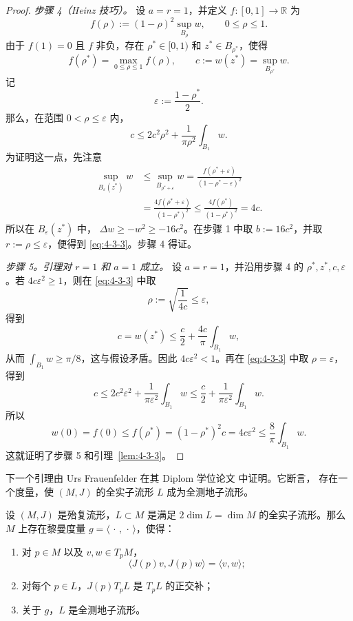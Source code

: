 \begin{proof}
\smallskip
\noindent\textit{步骤 4（Heinz 技巧）。}
设 $a=r=1$，并定义 $f:[0,1]\to\mathbb R$ 为
\[
  f(\rho):=(1-\rho)^2\sup_{B_\rho}w,
  \qquad
  0\le\rho\le1.
\]
由于 $f(1)=0$ 且 $f$ 非负，存在 $\rho^*\in[0,1)$ 和 $z^*\in B_{\rho^*}$，使得
\[
  f(\rho^*)=\max_{0\le\rho\le1}f(\rho),
  \qquad
  c:=w(z^*)=\sup_{B_{\rho^*}}w.
\]
记
\[
  \varepsilon:=\frac{1-\rho^*}{2}.
\]
那么，在范围
$0<\rho\le\varepsilon$ 内，
\begin{equation}\label{eq:4-3-3}
  c\le2c^2\rho^2+\frac{1}{\pi\rho^2}\int_{B_1}w.
\end{equation}
为证明这一点，先注意
\[
\begin{aligned}
  \sup_{B_\varepsilon(z^*)}w
  &\le\sup_{B_{\rho^*+\varepsilon}}w
   =\frac{f(\rho^*+\varepsilon)}
          {(1-\rho^*-\varepsilon)^2} \\
  &=\frac{4f(\rho^*+\varepsilon)}{(1-\rho^*)^2}
   \le\frac{4f(\rho^*)}{(1-\rho^*)^2}
   =4c.
\end{aligned}
\]
所以在 $B_\varepsilon(z^*)$ 中，
$\Delta w\ge-w^2\ge-16c^2$。在步骤 1 中取 $b:=16c^2$，并取
$r:=\rho\le\varepsilon$，便得到 \eqref{eq:4-3-3}。步骤 4 得证。

\smallskip
\noindent\textit{步骤 5。引理对 $r=1$ 和 $a=1$ 成立。}
设 $a=r=1$，并沿用步骤 4 的 $\rho^*,z^*,c,\varepsilon$。若
$4c\varepsilon^2\ge1$，则在 \eqref{eq:4-3-3} 中取
\[
  \rho:=\sqrt{\frac1{4c}}\le\varepsilon,
\]
得到
\[
  c=w(z^*)
  \le\frac c2+\frac{4c}{\pi}\int_{B_1}w,
\]
从而 $\int_{B_1}w\ge\pi/8$，这与假设矛盾。因此
$4c\varepsilon^2<1$。再在 \eqref{eq:4-3-3} 中取 $\rho=\varepsilon$，得到
\[
  c
  \le2c^2\varepsilon^2
    +\frac{1}{\pi\varepsilon^2}\int_{B_1}w
  \le\frac c2
    +\frac{1}{\pi\varepsilon^2}\int_{B_1}w.
\]
所以
\[
  w(0)=f(0)
  \le f(\rho^*)
  =(1-\rho^*)^2c
  =4c\varepsilon^2
  \le\frac8\pi\int_{B_1}w.
\]
这就证明了步骤 5 和引理~\ref{lem:4-3-3}。
\end{proof}

下一个引理由 Urs Frauenfelder 在其 Diplom 学位论文  中证明。它断言，
存在一个度量，使 $(M,J)$ 的全实子流形 $L$ 成为全测地子流形。

\begin{lemma}[Frauenfelder]\label{lem:4-3-4}
设 $(M,J)$ 是殆复流形，$L\subset M$ 是满足
$2\dim L=\dim M$ 的全实子流形。那么 $M$ 上存在黎曼度量
$g=\langle\,\cdot\,,\,\cdot\,\rangle$，使得：
\begin{enumerate}[label=\textup{(\roman*)},leftmargin=3em]
\item 对 $p\in M$ 以及 $v,w\in T_pM$，
\[
  \langle J(p)v,J(p)w\rangle=\langle v,w\rangle;
\]
\item 对每个 $p\in L$，$J(p)T_pL$ 是 $T_pL$ 的正交补；
\item 关于 $g$，$L$ 是全测地子流形。
\end{enumerate}
\end{lemma}

